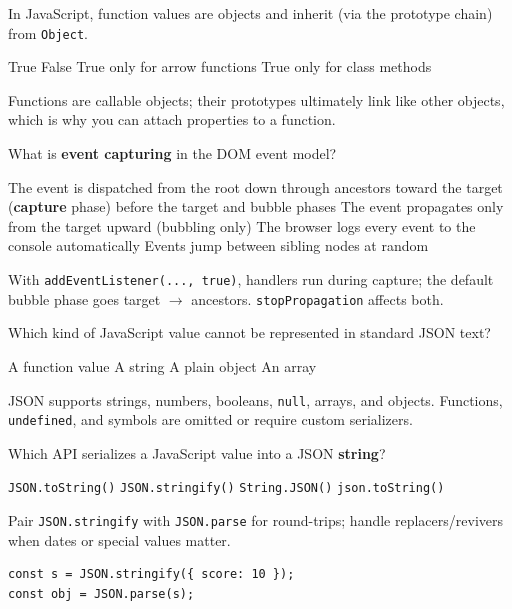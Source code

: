 \question[4]
In JavaScript, function values are objects and inherit (via the prototype chain) from \texttt{Object}.
\begin{choices}
  \CorrectChoice True
  \choice False
  \choice True only for arrow functions
  \choice True only for class methods
\end{choices}
\begin{solution}
  Functions are callable objects; their prototypes ultimately link like other objects, which is why you can attach properties to a function.
\end{solution}

\question[4]
What is \textbf{event capturing} in the DOM event model?
\begin{choices}
  \CorrectChoice The event is dispatched from the root down through ancestors toward the target (\textbf{capture} phase) before the target and bubble phases
  \choice The event propagates only from the target upward (bubbling only)
  \choice The browser logs every event to the console automatically
  \choice Events jump between sibling nodes at random
\end{choices}
\begin{solution}
  With \texttt{addEventListener(..., true)}, handlers run during capture; the default bubble phase goes target $\rightarrow$ ancestors. \texttt{stopPropagation} affects both.
\end{solution}

\question[4]
Which kind of JavaScript value cannot be represented in standard JSON text?
\begin{choices}
  \CorrectChoice A function value
  \choice A string
  \choice A plain object
  \choice An array
\end{choices}
\begin{solution}
  JSON supports strings, numbers, booleans, \texttt{null}, arrays, and objects. Functions, \texttt{undefined}, and symbols are omitted or require custom serializers.
\end{solution}

\question[4]
Which API serializes a JavaScript value into a JSON \textbf{string}?
\begin{choices}
  \choice \texttt{JSON.toString()}
  \CorrectChoice \texttt{JSON.stringify()}
  \choice \texttt{String.JSON()}
  \choice \texttt{json.toString()}
\end{choices}
\begin{solution}
  Pair \texttt{JSON.stringify} with \texttt{JSON.parse} for round-trips; handle replacers/revivers when dates or special values matter.
\begin{lstlisting}[style=jsexam]
const s = JSON.stringify({ score: 10 });
const obj = JSON.parse(s);
\end{lstlisting}
\end{solution}

